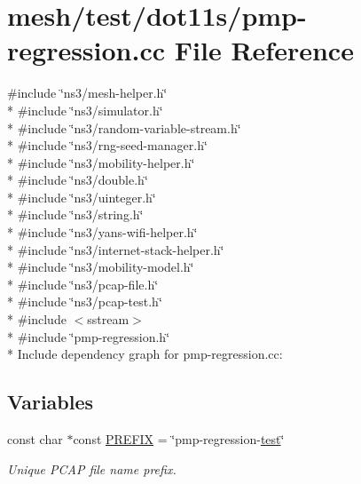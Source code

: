 \hypertarget{pmp-regression_8cc}{}\section{mesh/test/dot11s/pmp-\/regression.cc File Reference}
\label{pmp-regression_8cc}
{\ttfamily \#include \char`\"{}ns3/mesh-\/helper.\+h\char`\"{}}\\*
{\ttfamily \#include \char`\"{}ns3/simulator.\+h\char`\"{}}\\*
{\ttfamily \#include \char`\"{}ns3/random-\/variable-\/stream.\+h\char`\"{}}\\*
{\ttfamily \#include \char`\"{}ns3/rng-\/seed-\/manager.\+h\char`\"{}}\\*
{\ttfamily \#include \char`\"{}ns3/mobility-\/helper.\+h\char`\"{}}\\*
{\ttfamily \#include \char`\"{}ns3/double.\+h\char`\"{}}\\*
{\ttfamily \#include \char`\"{}ns3/uinteger.\+h\char`\"{}}\\*
{\ttfamily \#include \char`\"{}ns3/string.\+h\char`\"{}}\\*
{\ttfamily \#include \char`\"{}ns3/yans-\/wifi-\/helper.\+h\char`\"{}}\\*
{\ttfamily \#include \char`\"{}ns3/internet-\/stack-\/helper.\+h\char`\"{}}\\*
{\ttfamily \#include \char`\"{}ns3/mobility-\/model.\+h\char`\"{}}\\*
{\ttfamily \#include \char`\"{}ns3/pcap-\/file.\+h\char`\"{}}\\*
{\ttfamily \#include \char`\"{}ns3/pcap-\/test.\+h\char`\"{}}\\*
{\ttfamily \#include $<$sstream$>$}\\*
{\ttfamily \#include \char`\"{}pmp-\/regression.\+h\char`\"{}}\\*
Include dependency graph for pmp-\/regression.cc\+:
\subsection*{Variables}
\begin{DoxyCompactItemize}
\item 
const char $\ast$const \hyperlink{pmp-regression_8cc_a61dc66981fa47bfd0066a57a487c599c}{P\+R\+E\+F\+IX} = \char`\"{}pmp-\/regression-\/\hyperlink{main-test-sync_8cc_a708a4c1a4d0c4acc4c447310dd4db27f}{test}\char`\"{}
\begin{DoxyCompactList}\small\item\em Unique P\+C\+AP file name prefix. \end{DoxyCompactList}\end{DoxyCompactItemize}


